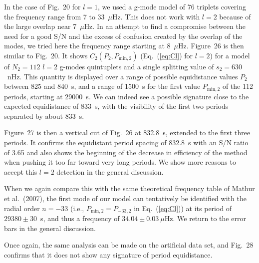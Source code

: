 \documentclass[bibyear]{aa}
\begin{document}
In the case of Fig.~20 for $l=1$, we used a g-mode model of 76 triplets covering the frequency range from 7 to 33~$\mu$Hz. This does not work with $l=2$ because of the large overlap near 7~$\mu$Hz. In an attempt to find a compromise between the need for a good S/N and the excess of confusion created by the overlap of the
modes, we tried here the frequency range starting at 8~$\mu$Hz. Figure~26 is then similar to Fig.~20. It shows $C_2(P_2,P_{\mathrm{min},2})$ (Eq.~(\ref{eq:Cl}) for $l=2$) for a model of $N_2=112$ $l=2$ g-modes quintuplets and a single splitting value of $s_2=630$~nHz. This quantity is displayed over a range of possible equidistance values $P_2$ between 825 and 840~s, and a range of 1500~s for the first value $P_{\mathrm{min},2}$ of the 112 periods, starting  at 29000~s. We can indeed see a possible signature close to the expected equidistance of 833~s, with the visibility of the first two periods separated by about 833~s.



Figure~27 is then a vertical cut of Fig.~26 at 832.8~s, extended to the first three periods. It confirms the equidistant period spacing of 832.8~s with an S/N ratio of 3.65 and also shows the beginning of the decrease in efficiency of the method when pushing it too far toward very long periods.  We show more reasons to accept this $l=2$ detection in the
general discussion.

When we again compare this with the same theoretical frequency table of Mathur et al.~(2007), the first mode of our model can tentatively be identified with the radial order $n = -33$ (i.e., $P_{\mathrm{min},2}=P_{-33,2}$ in Eq.~(\ref{eq:Cl})) at its period of $29380\pm 30$~s, and thus a frequency of $34.04\pm 0.03\ \mu$Hz. We return to the error bars in the general discussion. 

Once again, the same analysis can be made on the artificial data set, and Fig.~28 confirms that it does not show any signature of period equidistance.
\end{document}
